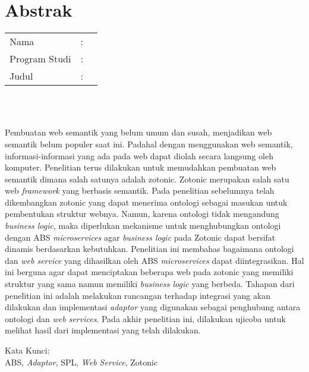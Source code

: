 %
%
%

\chapter*{Abstrak}

\vspace*{0.2cm}

\noindent \begin{tabular}{l l p{10cm}}
	Nama&: & \penulis \\
	Program Studi&: & \program \\
	Judul&: & \judul \\
\end{tabular} \\ 

\vspace*{0.5cm}

\noindent 
\\ Pembuatan web semantik yang belum umum dan susah, menjadikan web semantik belum populer saat ini. Padahal dengan menggunakan web semantik, informasi-informasi yang ada pada web dapat diolah secara langsung oleh komputer. Penelitian terus dilakukan untuk memudahkan pembuatan web semantik dimana salah satunya adalah zotonic. Zotonic merupakan salah satu web \textit{framework} yang berbasis semantik. Pada penelitian sebelumnya telah dikembangkan zotonic yang dapat menerima ontologi sebagai masukan untuk pembentukan struktur webnya. Namun, karena ontologi tidak mengandung \textit{business logic}, maka diperlukan mekanisme untuk menghubungkan ontologi dengan ABS \textit{microservices} agar \textit{business logic} pada Zotonic dapat bersifat dinamis berdasarkan kebutuhkan. Penelitian ini membahas bagaimana ontologi dan \textit{web service} yang dihasilkan oleh ABS \textit{microservices} dapat diintegrasikan. Hal ini berguna agar dapat menciptakan beberapa web pada zotonic yang memiliki struktur yang sama namun memiliki \textit{business logic} yang berbeda. Tahapan dari penelitian ini adalah melakukan rancangan terhadap integrasi yang akan dilakukan dan implementasi \textit{adaptor} yang digunakan sebagai penghubung antara ontologi dan \textit{web services}. Pada akhir penelitian ini, dilakukan ujicoba untuk melihat hasil dari implementasi yang telah dilakukan.

\vspace*{0.2cm}

\noindent Kata Kunci: \\ 
\noindent ABS, \textit{Adaptor}, SPL, \textit{Web Service}, Zotonic\\ 

\newpage